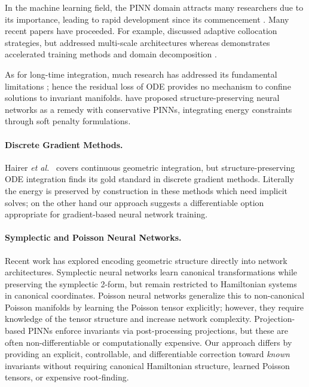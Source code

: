 \documentclass[pdflatex,sn-mathphys-num]{sn-jnl}
\theoremstyle{thmstyleone}%
\theoremstyle{thmstyletwo}%
\theoremstyle{thmstylethree}%
\begin{document}
	In the machine learning field, the PINN domain attracts many researchers due to its importance, leading to rapid development since its commencement \cite{raissi2019physics,cuomo2022scientific,daw2022physics}. Many recent papers have proceeded. For example, \cite{cai2021physics} discussed adaptive collocation strategies, but \cite{wang2022respecting} addressed multi-scale architectures whereas \cite{sharma2023accelerated} demonstrates accelerated training methods and domain decomposition \cite{jagtap2020conservative}.
	
	As for long-time integration, much research has addressed its fundamental limitations \cite{krishnapriyan2021characterizing,stiasny2022investigating}; hence the residual loss of ODE provides no mechanism to confine solutions to invariant manifolds. \cite{jagtap2020conservative,jin2020conservative} have proposed structure-preserving neural networks as a remedy with conservative PINNs, integrating energy constraints through soft penalty formulations.
	
	\paragraph{Discrete Gradient Methods.} Hairer \textit{et al.}\ \cite{hairer2006geometric} covers continuous geometric integration, but structure-preserving ODE integration finds its gold standard in discrete gradient methods. Literally the energy is preserved by construction in these methods which need implicit solves; on the other hand our approach suggests a differentiable option appropriate for gradient-based neural network training.
	
	\paragraph{Symplectic and Poisson Neural Networks.} Recent work has explored encoding geometric structure directly into network architectures. Symplectic neural networks \cite{chen2020symplectic,xue2023learning} learn canonical transformations while preserving the symplectic 2-form, but remain restricted to Hamiltonian systems in canonical coordinates. Poisson neural networks \cite{zhang2023poisson} generalize this to non-canonical Poisson manifolds by learning the Poisson tensor explicitly; however, they require knowledge of the tensor structure and increase network complexity. Projection-based PINNs \cite{berruz2023projection} enforce invariants via post-processing projections, but these are often non-differentiable or computationally expensive. Our approach differs by providing an explicit, controllable, and differentiable correction toward \textit{known} invariants without requiring canonical Hamiltonian structure, learned Poisson tensors, or expensive root-finding.
	
\end{document}

